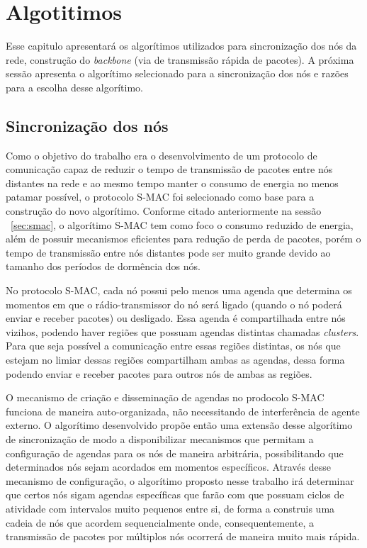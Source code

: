 \chapter{Algotitimos}

Esse capitulo apresentará os algorítimos utilizados para sincronização dos nós da rede, construção do \emph{backbone} (via de transmissão rápida de pacotes). 
A próxima sessão apresenta o algorítimo selecionado para a sincronização dos nós e razões para a escolha desse algorítimo.

\section{Sincronização dos nós}

Como o objetivo do trabalho era o desenvolvimento de um protocolo de comunicação capaz de reduzir o tempo de transmissão de pacotes entre nós distantes na rede e ao mesmo tempo manter o consumo de energia no menos patamar possível, o protocolo S-MAC\cite{ye04} foi selecionado como base para a construção do novo algorítimo. Conforme citado anteriormente na sessão ~\ref{sec:smac}, o algorítimo S-MAC tem como foco o consumo reduzido de energia, além de possuir mecanismos eficientes para redução de perda de pacotes, porém o tempo de transmissão entre nós distantes pode ser muito grande devido ao tamanho dos períodos de dormência dos nós.

No protocolo S-MAC\cite{ye04}, cada nó possui pelo menos uma agenda que determina os momentos em que o rádio-transmissor do nó será ligado (quando o nó poderá enviar e receber pacotes) ou desligado. Essa agenda é compartilhada entre nós vizihos, podendo haver regiões que possuam agendas distintas chamadas \emph{clusters}. Para que seja possível a comunicação entre essas regiões distintas, os nós que estejam no limiar dessas regiões compartilham ambas as agendas, dessa forma podendo enviar e receber pacotes para outros nós de ambas as regiões.

O mecanismo de criação e disseminação de agendas no prodocolo S-MAC funciona de maneira auto-organizada, não necessitando de interferência de agente externo. O algorítimo desenvolvido propõe então uma extensão desse algorítimo de sincronização de modo a disponibilizar mecanismos que permitam a configuração de agendas para os nós de maneira arbitrária, possibilitando que determinados nós sejam acordados em momentos específicos. Através desse mecanismo de configuração, o algorítimo proposto nesse trabalho irá determinar que certos nós sigam agendas específicas que farão com que possuam ciclos de atividade com intervalos muito pequenos entre si, de forma a construis uma cadeia de nós que acordem sequencialmente onde, consequentemente, a transmissão de pacotes por múltiplos nós ocorrerá de maneira muito mais rápida.

